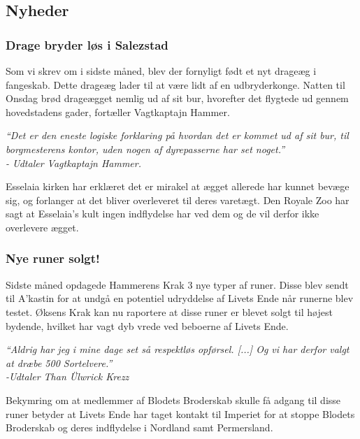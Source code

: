 \documentclass[letterpaper,12pt]{memoir}
\newenvironment{pullquote}
  {\begin{tcolorbox}\itshape\large}
  {\end{tcolorbox}}
\begin{document}
\subsection*{Nyheder}
\subsubsection*{Drage bryder løs i Salezstad}
Som vi skrev om i sidste måned, blev der fornyligt født et nyt drageæg i fangeskab. Dette drageæg lader til at være lidt af en udbryderkonge. Natten til Onsdag brød drageægget nemlig ud af sit bur, hvorefter det flygtede ud gennem hovedstadens gader, fortæller Vagtkaptajn Hammer. 

\begin{pullquote}
“Det er den eneste logiske forklaring på hvordan det er kommet ud af sit bur, til borgmesterens kontor, uden nogen af dyrepasserne har set noget.”\\
\textit{- Udtaler Vagtkaptajn Hammer.}
\end{pullquote}

Esselaia kirken har erklæret det er mirakel at ægget allerede har kunnet bevæge sig, og forlanger at det bliver overleveret til deres varetægt. Den Royale Zoo har sagt at Esselaia's kult ingen indflydelse har ved dem og de vil derfor ikke overlevere ægget.

\subsubsection*{Nye runer solgt!}
Sidste måned opdagede Hammerens Krak 3 nye typer af runer. Disse blev sendt til A'kastin for at undgå en potentiel udryddelse af Livets Ende når runerne blev testet. Øksens Krak kan nu raportere at disse runer er blevet solgt til højest bydende, hvilket har vagt dyb vrede ved beboerne af Livets Ende.

\begin{pullquote}
“Aldrig har jeg i mine dage set så respektløs opførsel. [...] Og vi har derfor valgt at dræbe 500 Sortelvere.”\\
\textit{-Udtaler Than Ülwrick Krezz}
\end{pullquote}

Bekymring om at medlemmer af Blodets Broderskab skulle få adgang til disse runer betyder at Livets Ende har taget kontakt til Imperiet for at stoppe Blodets Broderskab og deres indflydelse i Nordland samt Permersland.
\end{document}
